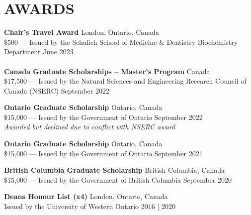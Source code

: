 \documentclass[a4paper,9pt]{extarticle}
\begin{document}
\section*{AWARDS}
\noindent
\begin{minipage}{1\textwidth}
\setlength{\parindent}{15pt} %
	\noindent
	\textbf{Chair's Travel Award}  \hfill London, Ontario, Canada\\ 
	\$500 --- Issued by the Schulich School of Medicine \& Dentistry Biochemistry Department \hfill June 2023\\ \\
	\textbf{Canada Graduate Scholarships -- Master's Program}  \hfill Canada\\ 
	\$17,500 --- Issued by the Natural Sciences and Engineering Research Council of Canada (NSERC) \hfill September 2022\\ 
\end{minipage}

\noindent
\begin{minipage}{1\textwidth}
\setlength{\parindent}{15pt} %
	\noindent
	\textbf{Ontario Graduate Scholarship}  \hfill Ontario, Canada\\ 
	\$15,000 --- Issued by the Government of Ontario \hfill September 2022\\ 
	\textit{Awarded but declined due to conflict with NSERC award}\\ 
\end{minipage}

\noindent
\begin{minipage}{1\textwidth}
\setlength{\parindent}{15pt} %
	\noindent
	\textbf{Ontario Graduate Scholarship}  \hfill Ontario, Canada\\ 
	\$15,000 --- Issued by the Government of Ontario \hfill September 2021\\ 
\end{minipage}

\noindent
\begin{minipage}{1\textwidth}
\setlength{\parindent}{15pt} %
	\noindent
	\textbf{British Columbia Graduate Scholarship}  \hfill British Columbia, Canada\\ 
	\$15,000 --- Issued by the Government of British Columbia \hfill September 2020\\ 
\end{minipage}

\noindent
\begin{minipage}{1\textwidth}
\setlength{\parindent}{15pt} %
	\noindent
	\textbf{Deans Honour List (x4)}  \hfill London, Ontario, Canada\\ 
	Issued by the University of Western Ontario \hfill 2016 | 2020\\ 
\end{minipage}
\end{document}
